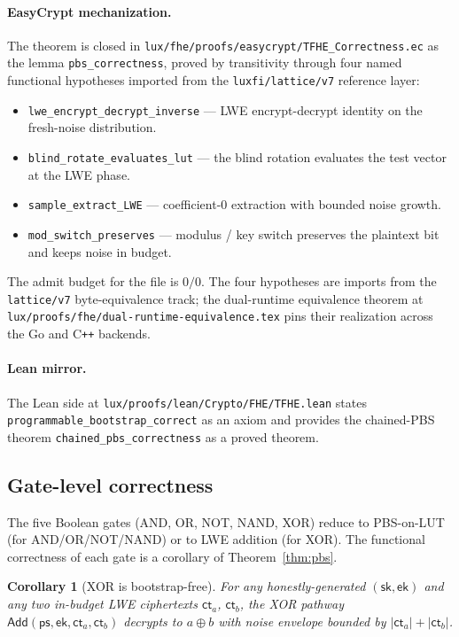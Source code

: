\documentclass[11pt,a4paper]{article}
\newtheorem{corollary}[theorem]{Corollary}
\begin{document}
\paragraph{EasyCrypt mechanization.} The theorem is closed in
\texttt{lux/fhe/proofs/easycrypt/TFHE\_Correctness.ec} as the lemma
\texttt{pbs\_correctness}, proved by transitivity through four
named functional hypotheses imported from the
\texttt{luxfi/lattice/v7} reference layer:
\begin{itemize}
\item \texttt{lwe\_encrypt\_decrypt\_inverse} --- LWE
  encrypt-decrypt identity on the fresh-noise distribution.
\item \texttt{blind\_rotate\_evaluates\_lut} --- the blind rotation
  evaluates the test vector at the LWE phase.
\item \texttt{sample\_extract\_LWE} --- coefficient-0 extraction
  with bounded noise growth.
\item \texttt{mod\_switch\_preserves} --- modulus / key switch
  preserves the plaintext bit and keeps noise in budget.
\end{itemize}
The admit budget for the file is $0/0$. The four hypotheses are
imports from the \texttt{lattice/v7} byte-equivalence track; the
dual-runtime equivalence theorem at
\texttt{lux/proofs/fhe/dual-runtime-equivalence.tex} pins their
realization across the Go and C\texttt{++} backends.

\paragraph{Lean mirror.} The Lean side at
\texttt{lux/proofs/lean/Crypto/FHE/TFHE.lean} states
\texttt{programmable\_bootstrap\_correct} as an axiom and provides
the chained-PBS theorem \texttt{chained\_pbs\_correctness} as a
proved theorem.

\subsection{Gate-level correctness}

The five Boolean gates (AND, OR, NOT, NAND, XOR) reduce to
PBS-on-LUT (for AND/OR/NOT/NAND) or to LWE addition (for XOR).
The functional correctness of each gate is a corollary of
Theorem~\ref{thm:pbs}.

\begin{corollary}[XOR is bootstrap-free]
\label{cor:xor-free}
For any honestly-generated $(\mathsf{sk}, \mathsf{ek})$ and any
two in-budget LWE ciphertexts $\mathsf{ct}_a$, $\mathsf{ct}_b$,
the XOR pathway $\mathsf{Add}(\mathsf{ps}, \mathsf{ek},
\mathsf{ct}_a, \mathsf{ct}_b)$ decrypts to $a \oplus b$ with
noise envelope bounded by $|\mathsf{ct}_a| + |\mathsf{ct}_b|$.
\end{corollary}
\end{document}
